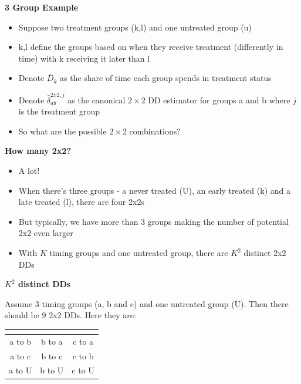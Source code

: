 \documentclass[notes=show]{beamer}
\begin{document}
\begin{frame}[plain]
\begin{center}
\textbf{3 Group Example}
\end{center}

\begin{itemize}
\item Suppose two treatment groups (k,l) and one untreated group (u)
\item k,l define the groups based on when they receive treatment (differently in time) with k receiving it later than l
\item Denote $\overline{D}_k$ as the share of time each group spends in treatment status
\item Denote $\widehat{\delta}_{ab}^{2x2,j}$ as the canonical $2\times 2$ DD estimator for groups a and b where $j$ is the treatment group
\item So what are the possible $2 \times 2$ combinations?
\end{itemize}

\end{frame}


\begin{frame}[plain]
\begin{center}
\textbf{How many 2x2?}
\end{center}

\begin{itemize}
\item A lot!
\item When there's three groups - a never treated (U), an early treated (k) and a late treated (l), there are four 2x2s
\item But typically, we have more than 3 groups making the number of potential 2x2 even larger
\item With $K$ timing groups and one untreated group, there are $K^2$ distinct 2x2 DDs
\end{itemize}

\end{frame}

\begin{frame}[plain]
\begin{center}
\textbf{$K^2$ distinct DDs}
\end{center}

Assume 3 timing groups (a, b and c) and one untreated group (U).  Then there should be 9 2x2 DDs.  Here they are:


\begin{center}
\begin{tabular}{c|c|c}
\multicolumn{1}{l}{} &
\multicolumn{1}{l}{} &
\multicolumn{1}{l}{} \\
\midrule
a to b & b to a & c to a \\
a to c & b to c & c to b \\
a to U & b to U & c to U \\
\midrule
\end{tabular}
\end{center}


\end{frame} 
\end{document}

